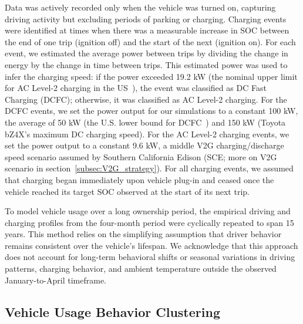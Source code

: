 \documentclass[pdflatex,sn-nature]{sn-jnl}%
\theoremstyle{thmstyleone}%
\theoremstyle{thmstyletwo}%
\theoremstyle{thmstylethree}%
\begin{document}
Data was actively recorded only when the vehicle was turned on, capturing driving activity but excluding periods of parking or charging. Charging events were identified at times when there was a measurable increase in SOC between the end of one trip (ignition off) and the start of the next (ignition on). For each event, we estimated the average power between trips by dividing the change in energy by the change in time between trips. This estimated power was used to infer the charging speed: if the power exceeded 19.2 kW (the nominal upper limit for AC Level-2 charging in the US~\cite{USDOT_2025_ChargerSpeeds}), the event was classified as DC Fast Charging (DCFC); otherwise, it was classified as AC Level-2 charging. For the DCFC events, we set the power output for our simulations to a constant 100 kW, the average of 50 kW (the U.S. lower bound for DCFC~\cite{USDOT_2025_ChargerSpeeds}) and 150 kW (Toyota bZ4X's maximum DC charging speed). For the AC Level-2 charging events, we set the power output to a constant 9.6 kW, a middle V2G charging/discharge speed scenario assumed by Southern California Edison (SCE; more on V2G scenario in section~\ref{subsec:V2G_strategy}). For all charging events, we assumed that charging began immediately upon vehicle plug-in and ceased once the vehicle reached its target SOC observed at the start of its next trip.

To model vehicle usage over a long ownership period, the empirical driving and charging profiles from the four-month period were cyclically repeated to span 15 years. This method relies on the simplifying assumption that driver behavior remains consistent over the vehicle's lifespan. We acknowledge that this approach does not account for long-term behavioral shifts or seasonal variations in driving patterns, charging behavior, and ambient temperature outside the observed January-to-April timeframe.

\subsection{Vehicle Usage Behavior Clustering}
\label{subsec:V2G_clustering}
\end{document}
